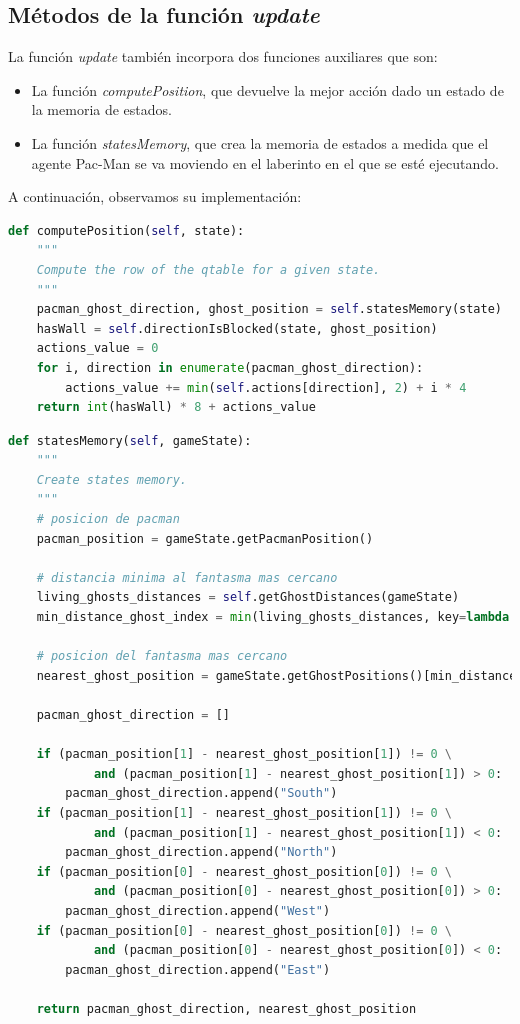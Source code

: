 \documentclass[11pt]{exam}
\begin{document}
\subsection{Métodos de la función \textit{update}}\label{apendice_update}

La función \textit{update} también incorpora dos funciones auxiliares que son:

\begin{itemize}
	\item La función \textit{computePosition}, que devuelve la mejor acción dado un estado de la memoria de estados.
	\item La función \textit{statesMemory}, que crea la memoria de estados a medida que el agente Pac-Man se va moviendo en el laberinto en el que se esté ejecutando.
\end{itemize}

A continuación, observamos su implementación:
\vspace*{3mm}

\begin{lstlisting}[caption={Función computePosition.}, label={computePosition}, language=python, basicstyle=\footnotesize]
def computePosition(self, state):
	"""
	Compute the row of the qtable for a given state.
	"""
	pacman_ghost_direction, ghost_position = self.statesMemory(state)
	hasWall = self.directionIsBlocked(state, ghost_position)
	actions_value = 0
	for i, direction in enumerate(pacman_ghost_direction):
		actions_value += min(self.actions[direction], 2) + i * 4
	return int(hasWall) * 8 + actions_value
\end{lstlisting}

\begin{lstlisting}[caption={Función statesMemory.}, label={statesMemory}, language=python, basicstyle=\footnotesize]
def statesMemory(self, gameState):
	"""
	Create states memory.
	"""
	# posicion de pacman
	pacman_position = gameState.getPacmanPosition()
	
	# distancia minima al fantasma mas cercano
	living_ghosts_distances = self.getGhostDistances(gameState)
	min_distance_ghost_index = min(living_ghosts_distances, key=lambda t: t[1])[0]
	
	# posicion del fantasma mas cercano
	nearest_ghost_position = gameState.getGhostPositions()[min_distance_ghost_index]
	
	pacman_ghost_direction = []
	
	if (pacman_position[1] - nearest_ghost_position[1]) != 0 \
			and (pacman_position[1] - nearest_ghost_position[1]) > 0:
		pacman_ghost_direction.append("South")
	if (pacman_position[1] - nearest_ghost_position[1]) != 0 \
			and (pacman_position[1] - nearest_ghost_position[1]) < 0:
		pacman_ghost_direction.append("North")
	if (pacman_position[0] - nearest_ghost_position[0]) != 0 \
			and (pacman_position[0] - nearest_ghost_position[0]) > 0:
		pacman_ghost_direction.append("West")
	if (pacman_position[0] - nearest_ghost_position[0]) != 0 \
			and (pacman_position[0] - nearest_ghost_position[0]) < 0:
		pacman_ghost_direction.append("East")
	
	return pacman_ghost_direction, nearest_ghost_position
\end{lstlisting}
\end{document}
